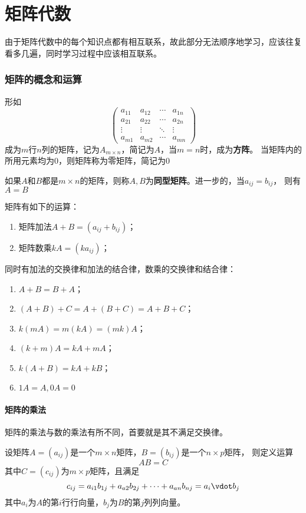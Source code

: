 \part{矩阵代数}
由于矩阵代数中的每个知识点都有相互联系，故此部分无法顺序地学习，应该往复看多几遍，同时学习过程中应该相互联系。
\section{矩阵的概念和运算}
形如
\[
    \begin{pmatrix}
        a_{11} & a_{12} & \cdots & a_{1n} \\
        a_{21} & a_{22} & \cdots & a_{2n} \\
        \vdots & \vdots & \ddots & \vdots \\
        a_{m1} & a_{m2} & \cdots & a_{mn}
    \end{pmatrix}
\]
成为$m$行$n$列的矩阵，记为$A_{m\times n}$，简记为$A$，当$m=n$时，成为\textbf{\textsf{方阵}}。
当矩阵内的所用元素均为$0$，则矩阵称为零矩阵，简记为$0$

如果$A$和$B$都是$m\times n$的矩阵，则称$A,B$为\textbf{\textsf{同型矩阵}}。进一步的，当$a_{ij}=b_{ij}$，
则有$A=B$

矩阵有如下的运算：
\begin{enumerate}[(1)]
    \item 矩阵加法$A+B=(a_{ij}+b_{ij})$；
    \item 矩阵数乘$kA = (ka_{ij})$；
\end{enumerate}

同时有加法的交换律和加法的结合律，数乘的交换律和结合律：
\begin{enumerate}[(1)]
    \item $A+B=B+A$；
    \item $(A+B)+C=A+(B+C)=A+B+C$；
    \item $k(mA) = m(kA) = (mk)A$；
    \item $(k+m)A = kA + mA$；
    \item $k(A+B) = kA + kB$；
    \item $1A=A, 0A = 0$
\end{enumerate}

\subsection{矩阵的乘法}
矩阵的乘法与数的乘法有所不同，首要就是其不满足交换律。
\begin{definition}
    设矩阵$A=(a_{ij})$是一个$m\times n$矩阵，$B=(b_{ij})$是一个$n\times p$矩阵，
    则定义运算
    \[ AB = C \]
    其中$C=(c_{ij})$为$m\times p$矩阵，且满足
    \[ c_{ij} = a_{i1}b_{1j} + a_{a2}b_{2j} + \cdots + a_{an}b_{nj} = a_i\vdot b_j \]
    其中$a_i$为$A$的第$i$行行向量，$b_j$为$B$的第$j$列列向量。
\end{definition}

